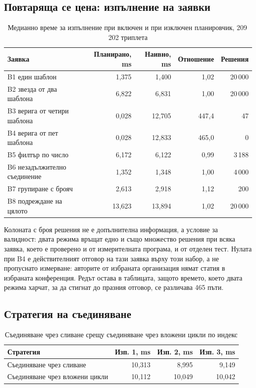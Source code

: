 \subsection{Повтаряща се цена: изпълнение на заявки}

\begin{table}[H]
\caption{Медианно време за изпълнение при включен и при изключен планировчик, 209\,202 триплета}
\label{tab:queries}
\centering
\fontsize{10}{12}\selectfont
\begin{tabular}{@{}L{5.4cm}rrrr@{}}
\toprule
\textbf{Заявка} & \textbf{Планирано, ms} & \textbf{Наивно, ms} & \textbf{Отношение} & \textbf{Решения} \\
\midrule
B1 един шаблон                & 1{,}375 & 1{,}400 & 1{,}02 & 20\,000 \\
B2 звезда от два шаблона      & 6{,}822 & 6{,}831 & 1{,}00 & 20\,000 \\
B3 верига от четири шаблона   & 0{,}028 & 12{,}705 & 447{,}4 & 47 \\
B4 верига от пет шаблона      & 0{,}028 & 12{,}833 & 465{,}0 & 0 \\
B5 филтър по число            & 6{,}172 & 6{,}122 & 0{,}99 & 3\,188 \\
B6 незадължително съединение  & 1{,}352 & 1{,}348 & 1{,}00 & 4\,000 \\
B7 групиране с брояч          & 2{,}613 & 2{,}918 & 1{,}12 & 200 \\
B8 подреждане на цялото       & 13{,}623 & 13{,}894 & 1{,}02 & 20\,000 \\
\bottomrule
\end{tabular}
\end{table}

Колоната с броя решения не е допълнителна информация, а условие за валидност: двата
режима връщат едно и също множество решения при всяка заявка, което е проверено и от
измерителната програма, и от отделен тест. Нулата при B4 е действителният отговор на тази
заявка върху този набор, а не пропуснато измерване: авторите от избраната организация
нямат статия в избраната конференция. Редът остава в таблицата, защото времето, което
двата режима харчат, за да стигнат до празния отговор, се различава 465 пъти.

\subsection{Стратегия на съединяване}

\begin{table}[H]
\caption{Съединяване чрез сливане срещу съединяване чрез вложени цикли по индекс}
\label{tab:joins}
\centering
\fontsize{10}{12}\selectfont
\begin{tabular}{@{}L{6.0cm}rrr@{}}
\toprule
\textbf{Стратегия} & \textbf{Изп. 1, ms} & \textbf{Изп. 2, ms} & \textbf{Изп. 3, ms} \\
\midrule
Съединяване чрез сливане & 10{,}313 & 8{,}995 & 9{,}149 \\
Съединяване чрез вложени цикли & 10{,}112 & 10{,}049 & 10{,}042 \\
\bottomrule
\end{tabular}
\end{table}

